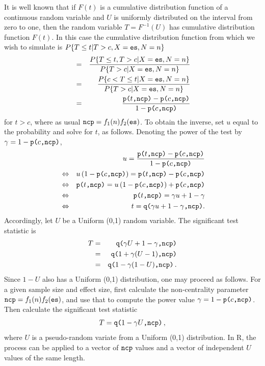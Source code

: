 \documentclass[jou]{apa6} %
\newcommand{\R}[1]{\mbox{\texttt{#1}}} %
\begin{document}
It is well known that if $F(t)$ is a cumulative distribution function of a continuous random variable
and $U$ is uniformly distributed on the interval from zero to one, then the random variable $T=F^{-1}(U)$ has cumulative distribution function $F(t)$. In this case the cumulative distribution function from which we wish to simulate is $P\{T \leq t | T>c, X=\R{es}, N=n \} $
\begin{eqnarray*}
    & = & \frac{ P\{T \leq t, T>c | X=\R{es}, N=n\} }{ P\{T>c | X=\R{es}, N=n\} } \\
    & = & \frac{ P\{c < T \leq t | X=\R{es}, N=n\} }{ P\{T>c | X=\R{es}, N=n\} } \\
    & = & \frac{ \R{p(}t\R{,ncp)}-\R{p(}c\R{,ncp)} } { 1-\R{p(}c\R{,ncp)} }
\end{eqnarray*}
for $t>c$, where as usual $\R{ncp} = f_1(n)f_2(\R{es})$. To obtain the inverse, set $u$ equal to the probability and solve for $t$, as follows. Denoting the power of the test by $\gamma = 1-\R{p(}c\R{,ncp)}$,
\begin{eqnarray*}
    && u =  \frac{ \R{p(}t\R{,ncp)}-\R{p(}c\R{,ncp)} } { 1-\R{p(}c\R{,ncp)} }   \\
    & \Leftrightarrow & 
    u \left(1-\R{p(}c\R{,ncp)}\right) = \R{p(}t\R{,ncp)}-\R{p(}c\R{,ncp)}       \\ 
    & \Leftrightarrow &
    \R{p(}t\R{,ncp)} = u \left(1-\R{p(}c\R{,ncp)}\right) + \R{p(}c\R{,ncp)}     \\
    & \Leftrightarrow &
    \R{p(}t\R{,ncp)} = \gamma u+1-\gamma                                        \\
    & \Leftrightarrow &
    t = \R{q(}\gamma u+1-\gamma\R{,ncp)}.
\end{eqnarray*}
Accordingly, let $U$ be a Uniform (0,1) random variable. The significant test statistic is
\begin{eqnarray*}
    T & = & \R{q(}\gamma U+1-\gamma\R{,ncp)} \\
      & = & \R{q(}1+\gamma (U-1)\R{,ncp)}      \\
      & = & \R{q(}1-\gamma (1-U)\R{,ncp)} \, .
\end{eqnarray*}
Since $1-U$ also has a Uniform (0,1) distribution, one may proceed as follows. For a given sample size and effect size, first calculate the non-centrality parameter $\R{ncp} = f_1(n)f_2(\R{es})$, and use that to compute the power value $\gamma = 1-\R{p(}c\R{,ncp)}$. Then calculate the significant test statistic 
\begin{equation} \label{sigstat}
    T = \R{q(}1-\gamma U\R{,ncp)} \, ,
\end{equation}
where $U$ is a pseudo-random variate from a Uniform (0,1) distribution. In R, the process can be applied to a vector of $\R{ncp}$ values and a vector of independent $U$ values of the same length. %
\end{document}
